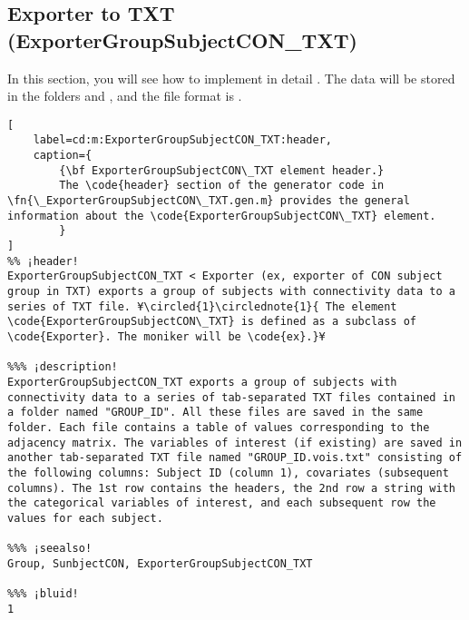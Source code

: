\documentclass{tufte-handout}
\begin{document}
\clearpage

\subsection{Exporter to TXT (ExporterGroupSubjectCON\_TXT)}

In this section, you will see how to implement in detail . The data will be stored in the folders  and , and the file format is .

\begin{lstlisting}[
	label=cd:m:ExporterGroupSubjectCON_TXT:header,
	caption={
		{\bf ExporterGroupSubjectCON\_TXT element header.}
		The \code{header} section of the generator code in \fn{\_ExporterGroupSubjectCON\_TXT.gen.m} provides the general information about the \code{ExporterGroupSubjectCON\_TXT} element.
		}
]
%% ¡header!
ExporterGroupSubjectCON_TXT < Exporter (ex, exporter of CON subject group in TXT) exports a group of subjects with connectivity data to a series of TXT file. ¥\circled{1}\circlednote{1}{ The element \code{ExporterGroupSubjectCON\_TXT} is defined as a subclass of \code{Exporter}. The moniker will be \code{ex}.}¥

%%% ¡description!
ExporterGroupSubjectCON_TXT exports a group of subjects with connectivity data to a series of tab-separated TXT files contained in a folder named "GROUP_ID". All these files are saved in the same folder. Each file contains a table of values corresponding to the adjacency matrix. The variables of interest (if existing) are saved in another tab-separated TXT file named "GROUP_ID.vois.txt" consisting of the following columns: Subject ID (column 1), covariates (subsequent columns). The 1st row contains the headers, the 2nd row a string with the categorical variables of interest, and each subsequent row the values for each subject.

%%% ¡seealso!
Group, SunbjectCON, ExporterGroupSubjectCON_TXT

%%% ¡bluid!
1
\end{lstlisting}
\end{document}
